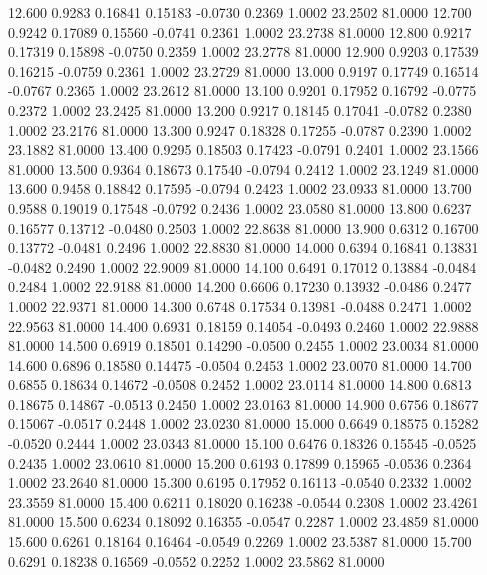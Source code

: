   12.600   0.9283   0.16841   0.15183  -0.0730   0.2369   1.0002  23.2502  81.0000
  12.700   0.9242   0.17089   0.15560  -0.0741   0.2361   1.0002  23.2738  81.0000
  12.800   0.9217   0.17319   0.15898  -0.0750   0.2359   1.0002  23.2778  81.0000
  12.900   0.9203   0.17539   0.16215  -0.0759   0.2361   1.0002  23.2729  81.0000
  13.000   0.9197   0.17749   0.16514  -0.0767   0.2365   1.0002  23.2612  81.0000
  13.100   0.9201   0.17952   0.16792  -0.0775   0.2372   1.0002  23.2425  81.0000
  13.200   0.9217   0.18145   0.17041  -0.0782   0.2380   1.0002  23.2176  81.0000
  13.300   0.9247   0.18328   0.17255  -0.0787   0.2390   1.0002  23.1882  81.0000
  13.400   0.9295   0.18503   0.17423  -0.0791   0.2401   1.0002  23.1566  81.0000
  13.500   0.9364   0.18673   0.17540  -0.0794   0.2412   1.0002  23.1249  81.0000
  13.600   0.9458   0.18842   0.17595  -0.0794   0.2423   1.0002  23.0933  81.0000
  13.700   0.9588   0.19019   0.17548  -0.0792   0.2436   1.0002  23.0580  81.0000
  13.800   0.6237   0.16577   0.13712  -0.0480   0.2503   1.0002  22.8638  81.0000
  13.900   0.6312   0.16700   0.13772  -0.0481   0.2496   1.0002  22.8830  81.0000
  14.000   0.6394   0.16841   0.13831  -0.0482   0.2490   1.0002  22.9009  81.0000
  14.100   0.6491   0.17012   0.13884  -0.0484   0.2484   1.0002  22.9188  81.0000
  14.200   0.6606   0.17230   0.13932  -0.0486   0.2477   1.0002  22.9371  81.0000
  14.300   0.6748   0.17534   0.13981  -0.0488   0.2471   1.0002  22.9563  81.0000
  14.400   0.6931   0.18159   0.14054  -0.0493   0.2460   1.0002  22.9888  81.0000
  14.500   0.6919   0.18501   0.14290  -0.0500   0.2455   1.0002  23.0034  81.0000
  14.600   0.6896   0.18580   0.14475  -0.0504   0.2453   1.0002  23.0070  81.0000
  14.700   0.6855   0.18634   0.14672  -0.0508   0.2452   1.0002  23.0114  81.0000
  14.800   0.6813   0.18675   0.14867  -0.0513   0.2450   1.0002  23.0163  81.0000
  14.900   0.6756   0.18677   0.15067  -0.0517   0.2448   1.0002  23.0230  81.0000
  15.000   0.6649   0.18575   0.15282  -0.0520   0.2444   1.0002  23.0343  81.0000
  15.100   0.6476   0.18326   0.15545  -0.0525   0.2435   1.0002  23.0610  81.0000
  15.200   0.6193   0.17899   0.15965  -0.0536   0.2364   1.0002  23.2640  81.0000
  15.300   0.6195   0.17952   0.16113  -0.0540   0.2332   1.0002  23.3559  81.0000
  15.400   0.6211   0.18020   0.16238  -0.0544   0.2308   1.0002  23.4261  81.0000
  15.500   0.6234   0.18092   0.16355  -0.0547   0.2287   1.0002  23.4859  81.0000
  15.600   0.6261   0.18164   0.16464  -0.0549   0.2269   1.0002  23.5387  81.0000
  15.700   0.6291   0.18238   0.16569  -0.0552   0.2252   1.0002  23.5862  81.0000
